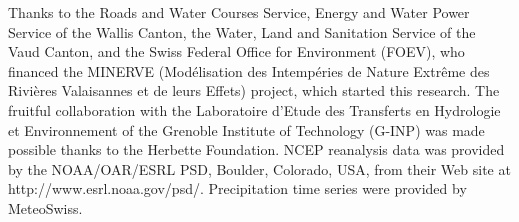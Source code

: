 \documentclass{ametsoc}
\begin{document}
Thanks to the Roads and Water Courses Service, Energy and Water Power Service of the Wallis Canton, the Water, Land and Sanitation Service of the Vaud Canton, and the Swiss Federal Office for Environment (FOEV), who financed the MINERVE (Mod\'{e}lisation des Intemp\'{e}ries de Nature Extr\^{e}me des Rivi\`{e}res Valaisannes et de leurs Effets) project, which started this research. The fruitful collaboration with the Laboratoire d'Etude des Transferts en Hydrologie et Environnement of the Grenoble Institute of Technology (G-INP) was made possible thanks to the Herbette Foundation. NCEP reanalysis data was provided by the NOAA/OAR/ESRL PSD, Boulder, Colorado, USA, from their Web site at http://www.esrl.noaa.gov/psd/. Precipitation time series were provided by MeteoSwiss. 


%






%
%
%


\end{document}
